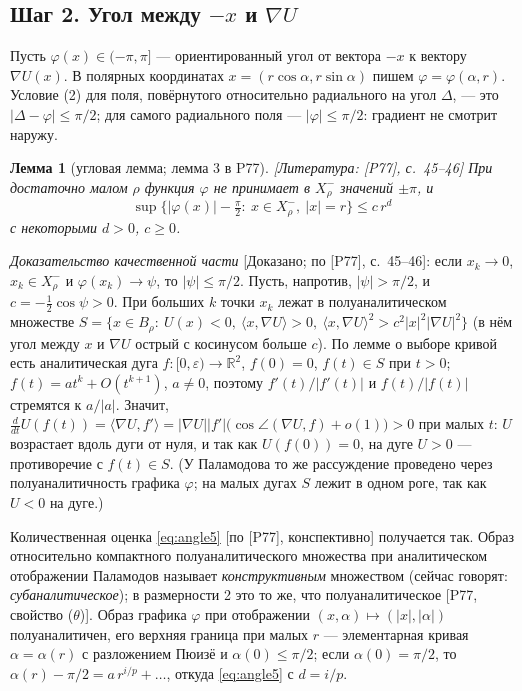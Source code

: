 \documentclass[11pt,a4paper]{article}
\newtheorem{lemma}[theorem]{Лемма}
\theoremstyle{definition}
\newcommand{\R}{\mathbb R}
\newcommand{\eps}{\varepsilon}
\newcommand{\mk}[1]{\textsf{[#1]}}
\newcommand{\term}[1]{\emph{#1}}
\begin{document}
\subsection{Шаг 2. Угол между $-x$ и $\nabla U$}

Пусть $\varphi(x)\in(-\pi,\pi]$ --- ориентированный угол от вектора $-x$ к вектору $\nabla U(x)$.
В полярных координатах $x=(r\cos\alpha,r\sin\alpha)$ пишем $\varphi=\varphi(\alpha,r)$.
Условие (2) для поля, повёрнутого относительно радиального на угол $\Delta$, --- это
$|\Delta-\varphi|\le\pi/2$; для самого радиального поля --- $|\varphi|\le\pi/2$: градиент не
смотрит наружу.

\begin{lemma}[угловая лемма; лемма 3 в P77]\label{lem:P77angle}
\mk{Литература: [P77], с.~45--46} При достаточно малом $\rho$ функция $\varphi$ не принимает в
$X^-_\rho$ значений $\pm\pi$, и
\begin{equation}\label{eq:angle5}
\sup\bigl\{|\varphi(x)|-\tfrac\pi2:\ x\in X^-_\rho,\ |x|=r\bigr\}\le c\,r^d
\end{equation}
с некоторыми $d>0$, $c\ge0$.
\end{lemma}

\emph{Доказательство качественной части} \mk{Доказано; по [P77], с.~45--46}: если $x_k\to0$,
$x_k\in X^-_\rho$ и $\varphi(x_k)\to\psi$, то $|\psi|\le\pi/2$. Пусть, напротив, $|\psi|>\pi/2$, и
$c=-\tfrac12\cos\psi>0$. При больших $k$ точки $x_k$ лежат в полуаналитическом множестве
$S=\{x\in B_\rho:\ U(x)<0,\ \langle x,\nabla U\rangle>0,\ \langle x,\nabla U\rangle^2>c^2|x|^2|\nabla U|^2\}$
(в нём угол между $x$ и $\nabla U$ острый с косинусом больше $c$). По лемме о выборе кривой есть
аналитическая дуга $f\colon[0,\eps)\to\R^2$, $f(0)=0$, $f(t)\in S$ при $t>0$; $f(t)=at^k+O(t^{k+1})$,
$a\ne0$, поэтому $f'(t)/|f'(t)|$ и $f(t)/|f(t)|$ стремятся к $a/|a|$. Значит,
$\frac{d}{dt}U(f(t))=\langle\nabla U,f'\rangle=|\nabla U||f'|\bigl(\cos\angle(\nabla U,f)+o(1)\bigr)>0$ при малых $t$:
$U$ возрастает вдоль дуги от нуля, и так как $U(f(0))=0$, на дуге $U>0$ --- противоречие с $f(t)\in S$.
(У Паламодова то же рассуждение проведено через полуаналитичность графика $\varphi$; на малых дугах
$S$ лежит в одном роге, так как $U<0$ на дуге.)

Количественная оценка \eqref{eq:angle5} \mk{по [P77], конспективно} получается так. Образ
относительно компактного полуаналитического множества при аналитическом отображении Паламодов
называет \term{конструктивным} множеством (сейчас говорят: \term{субаналитическое}); в размерности 2
это то же, что полуаналитическое [P77, свойство ($\theta$)]. Образ графика $\varphi$ при отображении
$(x,\alpha)\mapsto(|x|,|\alpha|)$ полуаналитичен, его верхняя граница при малых $r$ --- элементарная
кривая $\alpha=\alpha(r)$ с разложением Пюизё и $\alpha(0)\le\pi/2$; если $\alpha(0)=\pi/2$, то
$\alpha(r)-\pi/2=a\,r^{i/p}+\dots$, откуда \eqref{eq:angle5} с $d=i/p$.
\end{document}

